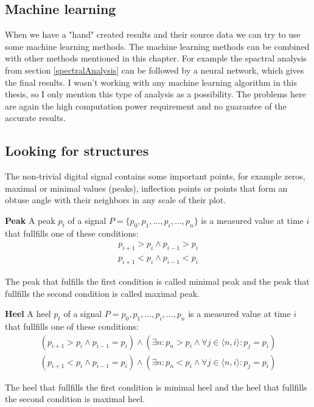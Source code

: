 \subsection{Machine learning}
When we have a "hand" created results and their source data we can try to use some machine learning methods. The machine learning methods can be combined with other methods mentioned in this chapter. For example the spactral analysis from section \ref{spectralAnalysis} can be followed by a neural network, which gives the final results. I wasn't working with any machine learning algorithm in this thesis, so I only mention this type of analysis as a possibility. The problems here are again the high computation power requirement and no guarantee of the accurate results.

\subsection{Looking for structures}
\label{signalLabelling}
The non-trivial digital signal contains some important points, for example zeros, maximal or minimal values (peaks), inflection points or points that form an obtuse angle with their neighbors in any scale of their plot.

\begin{definition}{\textbf{Peak}}
	A peak $p_t$ of a signal $P = \{p_0, p_1, \dots, p_i, \dots, p_n\}$ is a measured value at time $i$ that fullfills one of these conditions:
	\begin{eqnarray}
		p_{i+1} > p_i \land p_{i-1} > p_i \\
		p_{i+1} < p_i \land p_{i-1} < p_i
	\end{eqnarray}
	
	The peak that fulfills the first condition is called minimal peak and the peak that fullfills the second condition is called maximal peak.
\end{definition}

\begin{definition}{\textbf{Heel}}
	A heel $p_t$ of a signal $P = {p_0, p_1, \dots, p_i, \dots, p_n}$ is a measured value at time $i$ that fullfills one of these conditions:
	\begin{eqnarray}
	(p_{i+1} > p_i \land p_{i-1} = p_i) \land (\exists n : p_n > p_i \land \forall j \in \langle n, i \rangle : p_j = p_i) \\
	(p_{i+1} < p_i \land p_{i-1} = p_i) \land (\exists n : p_n < p_i \land \forall j \in \langle n, i \rangle : p_j = p_i)
	\end{eqnarray}
	
	The heel that fullfills the first condition is minimal heel and the heel that fullfills the second condition is maximal heel.
\end{definition}

